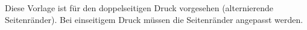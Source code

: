 Diese Vorlage ist für den doppelseitigen Druck vorgesehen (alternierende
Seitenränder). Bei einseitigem Druck müssen die Seitenränder angepasst werden.